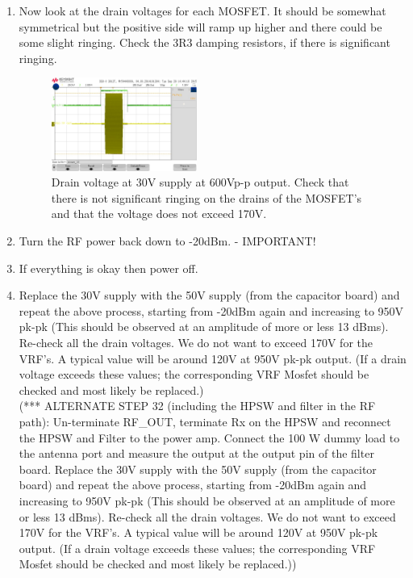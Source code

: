 \begin{enumerate}
\begin{figure}[H]
		\end{figure}
	\item Now look at the drain voltages for each MOSFET. It should be somewhat symmetrical but the positive side will ramp up higher and there could be some slight ringing. Check the 3R3 damping resistors, if there is significant ringing.
		\begin{figure}[H]
			\centering
			\includegraphics[width=0.45\textwidth]{images/hardware/signal_21.jpg}
			\caption{Drain voltage at 30V supply at 600Vp-p output. Check that there is not significant ringing on the drains of the MOSFET's and that the voltage does not exceed 170V.}
			\label{fig:hw_amp_signals_6}
		\end{figure}
	\item Turn the RF power back down to -20dBm. - IMPORTANT!
	\item If everything is okay then power off.
	\item Replace the 30V supply with the 50V supply (from the capacitor board) and repeat the above process, starting from -20dBm again and increasing to 950V pk-pk (This should be observed at an amplitude of more or less 13 dBms). Re-check all the drain voltages. We do not want to exceed 170V for the VRF’s. A typical value will be around 120V at 950V pk-pk output. (If a drain voltage exceeds these values; the corresponding VRF Mosfet should be checked and most likely be replaced.)\\
(*** ALTERNATE STEP 32 (including the HPSW and filter in the RF path): Un-terminate RF\_OUT, terminate Rx on the HPSW and reconnect the HPSW and Filter to the power amp. Connect the 100 W dummy load to the antenna port and measure the output at the output pin of the filter board. Replace the 30V supply with the 50V supply (from the capacitor board) and repeat the above process, starting from -20dBm again and increasing to 950V pk-pk (This should be observed at an amplitude of more or less 13 dBms). Re-check all the drain voltages. We do not want to exceed 170V for the VRF’s. A typical value will be around 120V at 950V pk-pk output. (If a drain voltage exceeds these values; the corresponding VRF Mosfet should be checked and most likely be replaced.))

\end{enumerate}
